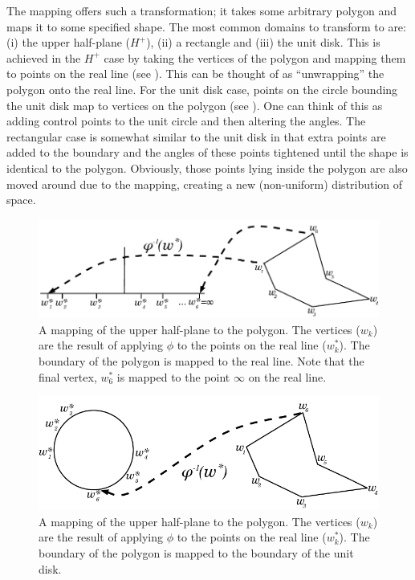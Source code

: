 The \sch mapping offers such a transformation; it takes some arbitrary polygon and maps it to some specified shape. The most common domains to transform to are: (i) the upper half-plane ($H^+$), (ii) a rectangle and (iii) the unit disk. This is achieved in the $H^+$ case by taking the vertices of the polygon and mapping them to points on the real line (see ). This can be thought of as ``unwrapping'' the polygon onto the real line. For the unit disk case, points on the circle bounding the unit disk map to vertices on the polygon (see ). One can think of this as adding control points to the unit circle and then altering the angles. The rectangular case is somewhat similar to the unit disk in that extra points are added to the boundary and the angles of these points tightened until the shape is identical to the polygon. Obviously, those points lying inside the polygon are also moved around due to the mapping, creating a new (non-uniform) distribution of space.

\begin{figure} [tbp]
\centering
\includegraphics[scale=0.6]{sc/figs/reallinedia.pdf}
\caption{A mapping of the upper half-plane to the polygon. The vertices ($w_k$) are the result of applying $\phi$ to the points on the real line ($w^*_k$). The boundary of the polygon is mapped to the real line. Note that the final vertex, $w^*_6$ is mapped to the point $\infty$ on the real line.}
\label{reallinedia}
\end{figure}

\begin{figure} [tbp]
\centering
\includegraphics[scale=0.6]{sc/figs/unitdiskdia.pdf}
\caption{A mapping of the upper half-plane to the polygon. The vertices ($w_k$) are the result of applying $\phi$ to the points on the real line ($w^*_k$). The boundary of the polygon is mapped to the boundary of the unit disk.}
\label{unitdiskdia}
\end{figure}

